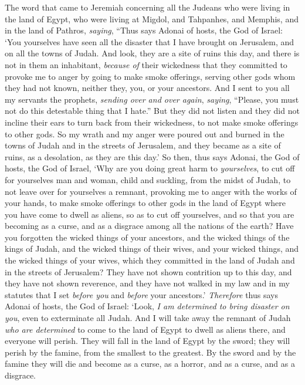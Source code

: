 \begin{biblechapter} %
 The word that came to Jeremiah concerning all the Judeans who were living in the land of Egypt, who were living at Migdol, and Tahpanhes, and Memphis, and in the land of Pathros, \textit{saying},
\verse “Thus says Adonai of hosts, the God of Israel: ‘You yourselves have seen all the disaster that I have brought on Jerusalem, and on all the towns of Judah. And look, they are a site of ruins this day, and there is not in them an inhabitant,
\verse \textit{because of} their wickedness that they committed to provoke me to anger by going to make smoke offerings, serving other gods whom they had not known, neither they, you, or your ancestors.
\verse And I sent to you all my servants the prophets, \textit{sending over and over again}, \textit{saying}, “Please, you must not do this detestable thing that I hate.”
\verse But they did not listen and they did not incline their ears to turn back from their wickedness, to not make smoke offerings to other gods.
\verse So my wrath and my anger were poured out and burned in the towns of Judah and in the streets of Jerusalem, and they became as a site of ruins, as a desolation, as they are this day.’
\verse So then, thus says Adonai, the God of hosts, the God of Israel, ‘Why are you doing great harm to \textit{yourselves}, to cut off for yourselves man and woman, child and suckling, from the midst of Judah, to not leave over for yourselves a remnant,
\verse provoking me to anger with the works of your hands, to make smoke offerings to other gods in the land of Egypt where you have come to dwell as aliens, so as to cut off yourselves, and so that you are becoming as a curse, and as a disgrace among all the nations of the earth?
\verse Have you forgotten the wicked things of your ancestors, and the wicked things of the kings of Judah, and the wicked things of their wives, and your wicked things, and the wicked things of your wives, which they committed in the land of Judah and in the streets of Jerusalem?
\verse They have not shown contrition up to this day, and they have not shown reverence, and they have not walked in my law and in my statutes that I set \textit{before you} and \textit{before} your ancestors.’
\verse \textit{Therefore} thus says Adonai of hosts, the God of Israel: ‘Look, \textit{I am determined to bring disaster on you}, even to exterminate all Judah.
\verse And I will take away the remnant of Judah \textit{who are determined} to come to the land of Egypt to dwell as aliens there, and everyone will perish. They will fall in the land of Egypt by the sword; they will perish by the famine, from the smallest to the greatest. By the sword and by the famine they will die and become as a curse, as a horror, and as a curse, and as a disgrace.

\end{biblechapter}
